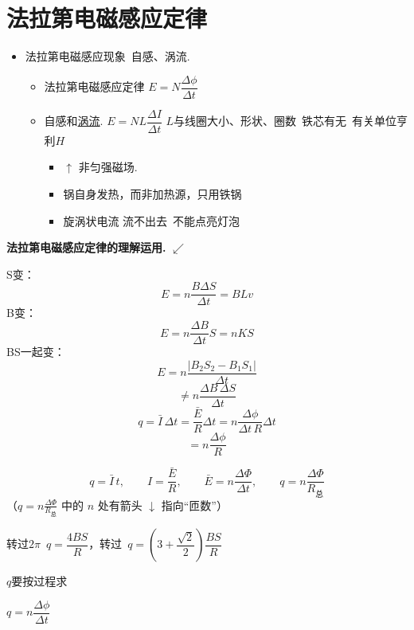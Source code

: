 \section{法拉第电磁感应定律}
\begin{itemize}
\item 法拉第电磁感应现象\ 自感、涡流.
 \begin{itemize}
 \item 法拉第电磁感应定律 \quad $E=N\dfrac{\Delta\phi}{\Delta t}$
 \item 自感和\underline{涡流}. \quad $E=NL\dfrac{\Delta I}{\Delta t}$ \quad $L$与线圈大小、形状、圈数\ 铁芯有无\ 有关\quad 单位亨利$H$
 \begin{itemize}
 \item $\uparrow$ 非匀强磁场.
 \item 锅自身发热，而非加热源，只用铁锅
 \item 旋涡状电流 流不出去\ 不能点亮灯泡
 \end{itemize}
 \end{itemize}
\end{itemize}

\textbf{法拉第电磁感应定律的理解运用.} $\swarrow$

S变：
\[
E=n\frac{B\Delta S}{\Delta t}=BLv
\]
B变：
\[
E=n\frac{\Delta B}{\Delta t}S=nKS
\]
BS一起变：
\[
E=n\frac{|B_2S_2-B_1S_1|}{\Delta t}
\]
\[
\ne n\frac{\Delta B\,\Delta S}{\Delta t}
\]
\[
q=\bar I\,\Delta t=\frac{\bar E}{R}\Delta t=n\frac{\Delta\phi}{\Delta t\,R}\Delta t
\]
\[
=n\frac{\Delta\phi}{R}
\]

\[
q=\bar I\,t,\qquad I=\frac{\bar E}{R},\qquad \bar E=n\frac{\Delta\Phi}{\Delta t},\qquad q=n\frac{\Delta\Phi}{R_{\text{总}}}
\]
（$q=n\frac{\Delta\Phi}{R_{\text{总}}}$ 中的 $n$ 处有箭头 $\downarrow$ 指向“匝数”）


转过$2\pi$\ $q=\dfrac{4BS}{R}$，转过\ $q=\left(3+\dfrac{\sqrt{2}}{2}\right)\dfrac{BS}{R}$

$q$要按过程求

$q=n\dfrac{\Delta\phi}{\Delta t}$ %


